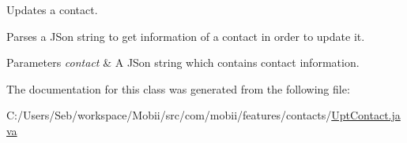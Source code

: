 Updates a contact. 

Parses a J\-Son string to get information of a contact in order to update it. 
\begin{DoxyParams}{Parameters}
{\em contact} & A J\-Son string which contains contact information. \\
\hline
\end{DoxyParams}


The documentation for this class was generated from the following file\-:\begin{DoxyCompactItemize}
\item 
C\-:/\-Users/\-Seb/workspace/\-Mobii/src/com/mobii/features/contacts/\hyperlink{_upt_contact_8java}{Upt\-Contact.\-java}\end{DoxyCompactItemize}
